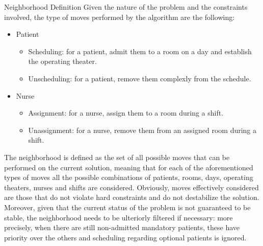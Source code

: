 \begin{section}
\begin{subsection}
 \end{subsection}

 \begin{subsection}
     {Neighborhood Definition}
     Given the nature of the problem and the constraints involved,
     the type of moves performed by the algorithm are the following:
     \begin{itemize}
         \item Patient
               \begin{itemize}
                   \item Scheduling: for a patient, admit them to a room on a day and establish the operating theater.
                   \item Unscheduling: for a patient, remove them complexly from the schedule.
               \end{itemize}
         \item Nurse
               \begin{itemize}
                   \item  Assignment: for a nurse, assign them to a room during a shift.
                   \item Unassignment: for a nurse, remove them from an assigned room during a shift.
               \end{itemize}
     \end{itemize}
     The neighborhood is defined as the set of all possible moves that can be performed
     on the current solution, meaning that for each of the aforementioned types of moves
     all the possible combinations of patients, rooms, days, operating theaters, nurses and shifts are considered.
     Obviously, moves effectively considered are those that do not violate hard constraints and do not destabilize the solution.
     Moreover, given that the current status of the problem is not guaranteed to be stable, the neighborhood
     needs to be ulteriorly filtered if necessary: more precisely, when there are still non-admitted mandatory patients,
     these have priority over the others and scheduling regarding optional patients is ignored.



\end{subsection}
\end{section}
